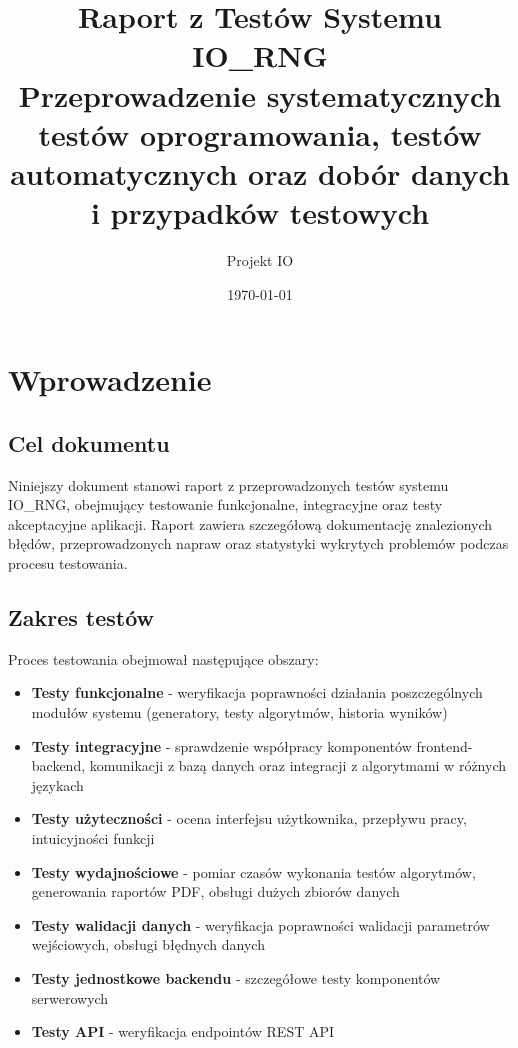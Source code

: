 \documentclass[12pt,a4paper]{article}
\title{\textbf{Raport z Testów Systemu IO\_RNG}\\
\large Przeprowadzenie systematycznych testów oprogramowania, testów automatycznych oraz dobór danych i przypadków testowych}
\author{Projekt IO}
\date{\today}
\begin{document}
\maketitle
\tableofcontents
\newpage

\section{Wprowadzenie}

\subsection{Cel dokumentu}

Niniejszy dokument stanowi raport z przeprowadzonych testów systemu IO\_RNG, obejmujący testowanie funkcjonalne, integracyjne oraz testy akceptacyjne aplikacji. Raport zawiera szczegółową dokumentację znalezionych błędów, przeprowadzonych napraw oraz statystyki wykrytych problemów podczas procesu testowania.

\subsection{Zakres testów}

Proces testowania obejmował następujące obszary:

\begin{itemize}
    \item \textbf{Testy funkcjonalne} - weryfikacja poprawności działania poszczególnych modułów systemu (generatory, testy algorytmów, historia wyników)
    \item \textbf{Testy integracyjne} - sprawdzenie współpracy komponentów frontend-backend, komunikacji z bazą danych oraz integracji z algorytmami w różnych językach
    \item \textbf{Testy użyteczności} - ocena interfejsu użytkownika, przepływu pracy, intuicyjności funkcji
    \item \textbf{Testy wydajnościowe} - pomiar czasów wykonania testów algorytmów, generowania raportów PDF, obsługi dużych zbiorów danych
    \item \textbf{Testy walidacji danych} - weryfikacja poprawności walidacji parametrów wejściowych, obsługi błędnych danych
    \item \textbf{Testy jednostkowe backendu} - szczegółowe testy komponentów serwerowych
    \item \textbf{Testy API} - weryfikacja endpointów REST API
\end{itemize}
\end{document}
